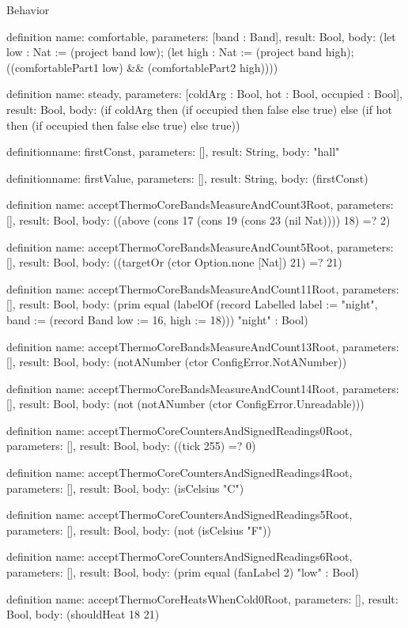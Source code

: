 \begin{lexlean}{Behavior}
\begin{semanticmodule}
definition{
  name: comfortable,
  parameters: [band : Band],
  result: Bool,
  body: (let low : Nat := (project band low); (let high : Nat := (project band high); ((comfortablePart1 low) && (comfortablePart2 high))))
}

definition{
  name: steady,
  parameters: [coldArg : Bool, hot : Bool, occupied : Bool],
  result: Bool,
  body: (if coldArg then (if occupied then false else true) else (if hot then (if occupied then false else true) else true))
}

definition{name: firstConst, parameters: [], result: String, body: "hall"}

definition{name: firstValue, parameters: [], result: String, body: (firstConst)}

definition{
  name: acceptThermoCoreBandsMeasureAndCount3Root,
  parameters: [],
  result: Bool,
  body: ((above (cons 17 (cons 19 (cons 23 (nil Nat)))) 18) =? 2)
}

definition{
  name: acceptThermoCoreBandsMeasureAndCount5Root,
  parameters: [],
  result: Bool,
  body: ((targetOr (ctor Option.none [Nat]) 21) =? 21)
}

definition{
  name: acceptThermoCoreBandsMeasureAndCount11Root,
  parameters: [],
  result: Bool,
  body: (prim equal (labelOf (record Labelled {label := "night", band := (record Band {low := 16, high := 18})})) "night" : Bool)
}

definition{
  name: acceptThermoCoreBandsMeasureAndCount13Root,
  parameters: [],
  result: Bool,
  body: (notANumber (ctor ConfigError.NotANumber))
}

definition{
  name: acceptThermoCoreBandsMeasureAndCount14Root,
  parameters: [],
  result: Bool,
  body: (not (notANumber (ctor ConfigError.Unreadable)))
}

definition{
  name: acceptThermoCoreCountersAndSignedReadings0Root,
  parameters: [],
  result: Bool,
  body: ((tick 255) =? 0)
}

definition{
  name: acceptThermoCoreCountersAndSignedReadings4Root,
  parameters: [],
  result: Bool,
  body: (isCelsius "C")
}

definition{
  name: acceptThermoCoreCountersAndSignedReadings5Root,
  parameters: [],
  result: Bool,
  body: (not (isCelsius "F"))
}

definition{
  name: acceptThermoCoreCountersAndSignedReadings6Root,
  parameters: [],
  result: Bool,
  body: (prim equal (fanLabel 2) "low" : Bool)
}

definition{
  name: acceptThermoCoreHeatsWhenCold0Root,
  parameters: [],
  result: Bool,
  body: (shouldHeat 18 21)
}


\end{semanticmodule}
\end{lexlean}
